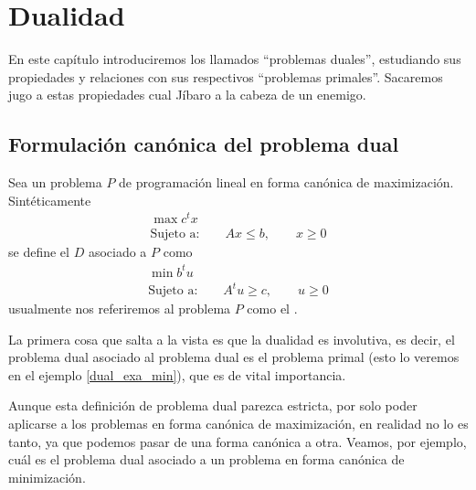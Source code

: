 \chapter{Dualidad}
\label{dual}
En este capítulo introduciremos los llamados ``problemas duales'', estudiando sus propiedades y relaciones con sus respectivos ``problemas primales''. Sacaremos jugo a estas propiedades cual Jíbaro a la cabeza de un enemigo.
\section{Formulación canónica del problema dual}
Sea un problema $P$ de programación lineal en forma canónica de maximización. Sintéticamente
\begin{equation*}
	\begin{array}{c}
		\max c^tx\\
		\text{Sujeto a:}\qquad Ax\leq b,\qquad x\geq 0
	\end{array}
\end{equation*}
se define el  $D$ asociado a $P$ como
\begin{equation*}
	\begin{array}{c}
		\min b^tu\\
		\text{Sujeto a:}\qquad A^tu\geq c,\qquad u\geq 0
	\end{array}
\end{equation*}
usualmente nos referiremos al problema $P$ como el .
\begin{obs}[Involutividad]
	La primera cosa que salta a la vista es que la dualidad es involutiva, es decir, el problema dual asociado al problema dual es el problema primal (esto lo veremos en el ejemplo \ref{dual_exa_min}), que es de vital importancia.
\end{obs}
Aunque esta definición de problema dual parezca estricta, por solo poder aplicarse a los problemas en forma canónica de maximización, en realidad no lo es tanto, ya que podemos pasar de una forma canónica a otra. Veamos, por ejemplo, cuál es el problema dual asociado a un problema en forma canónica de minimización.
